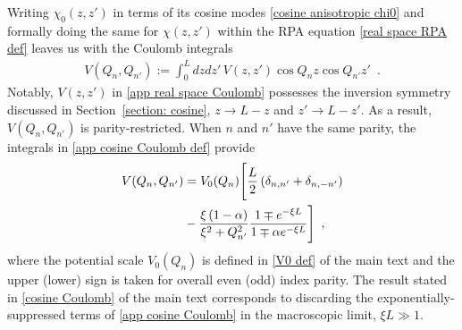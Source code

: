 Writing $\chi_0(z,z')$ in terms of its cosine modes \eqref{cosine anisotropic chi0} and formally doing the same for $\chi(z,z')$ within the RPA equation \eqref{real space RPA def} leaves us with the Coulomb integrals
\begin{align}
    \label{app cosine Coulomb def}
    V(Q_n, Q_{n'}):= \int_0^L dz dz'\, V(z,z') \cos Q_n z \cos Q_{n'} z'
    \,\,\,.
\end{align}
Notably, $V(z,z')$ in \eqref{app real space Coulomb} possesses the inversion symmetry discussed in Section~\ref{section: cosine}, $z\to L-z$ and $z'\to L-z'$.  As a result, $V(Q_n,Q_{n'})$ is parity-restricted.  When $n$ and $n'$ have the same parity, the integrals in \eqref{app cosine Coulomb def} provide
\begin{align}
    \label{app cosine Coulomb}
    V(Q_n,Q_{n'}) &=
    V_0(Q_n)\Bigg[
    \frac{L}{2}\left(\delta_{n,n'}+\delta_{n,-n'}\right)
    \\ \nonumber &-
    \frac{\xi\left(1-\alpha\right)}{\xi^2+Q_{n'}^2}
    \frac{1\mp e^{-\xi L}}{1\mp\alpha e^{-\xi L}}
    \Bigg]
    \,\,\,,
\end{align}
where the potential scale $V_0(Q_n)$ is defined in \eqref{V0 def} of the main text and the upper (lower) sign is taken for overall even (odd) index parity.  The result stated in \eqref{cosine Coulomb} of the main text corresponds to discarding the exponentially-suppressed terms of \eqref{app cosine Coulomb} in the macroscopic limit, $\xi L\gg 1$.